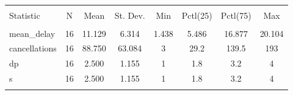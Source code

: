 
\begin{table}[!htbp] \centering 
  \caption{} 
  \label{} 
\begin{tabular}{@{\extracolsep{5pt}}lccccccc} 
\\[-1.8ex]\hline 
\hline \\[-1.8ex] 
Statistic & \multicolumn{1}{c}{N} & \multicolumn{1}{c}{Mean} & \multicolumn{1}{c}{St. Dev.} & \multicolumn{1}{c}{Min} & \multicolumn{1}{c}{Pctl(25)} & \multicolumn{1}{c}{Pctl(75)} & \multicolumn{1}{c}{Max} \\ 
\hline \\[-1.8ex] 
mean\_delay & 16 & 11.129 & 6.314 & 1.438 & 5.486 & 16.877 & 20.104 \\ 
cancellations & 16 & 88.750 & 63.084 & 3 & 29.2 & 139.5 & 193 \\ 
dp & 16 & 2.500 & 1.155 & 1 & 1.8 & 3.2 & 4 \\ 
s & 16 & 2.500 & 1.155 & 1 & 1.8 & 3.2 & 4 \\ 
\hline \\[-1.8ex] 
\end{tabular} 
\end{table} 
